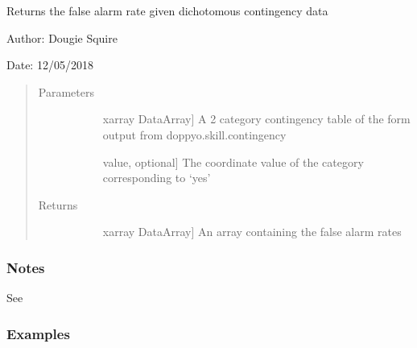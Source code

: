\documentclass[letterpaper,10pt,english]{sphinxmanual}
\begin{document}

\begin{fulllineitems}
\label{\detokenize{skill_doc:skill.false_alarm_rate}}
Returns the false alarm rate given dichotomous contingency data

\begin{DUlineblock}{0em}
\item[] Author: Dougie Squire
\item[] Date: 12/05/2018
\end{DUlineblock}
\begin{quote}\begin{description}
\item[{Parameters}] \leavevmode\begin{description}
\item[{}] \leavevmode{[}xarray DataArray{]}
A 2 category contingency table of the form output from doppyo.skill.contingency

\item[{}] \leavevmode{[}value, optional{]}
The coordinate value of the category corresponding to ‘yes’

\end{description}

\item[{Returns}] \leavevmode\begin{description}
\item[{}] \leavevmode{[}xarray DataArray{]}
An array containing the false alarm rates

\end{description}

\end{description}\end{quote}
\subsubsection*{Notes}

See 
\subsubsection*{Examples}


\end{fulllineitems}
\end{document}
